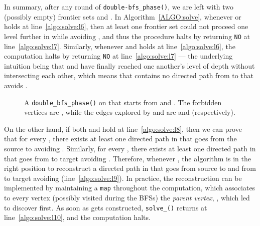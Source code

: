 In summary, after any round of \texttt{double-bfs\_phase()}, we are left with two (possibly empty) frontier sets  and .
In Algorithm~\ref{ALGO:solve}, whenever  or  holds at line~\ref{algo:solve:l6},
then at least one frontier set could not proceed one level further in  while avoiding ,
and thus the procedure halts by returning \texttt{NO} at line~\ref{algo:solve:l7}.
Similarly, whenever  and  holds at line~\ref{algo:solve:l6},
the computation halts by returning \texttt{NO} at line~\ref{algo:solve:l7} --- the underlying intuition being that
 and  have finally reached one another's level of depth without intersecting each other,
which means that  contains no directed path from  to  that avoids .

\begin{figure}[htbp]
\centering
{}
\caption{A \texttt{double\_bfs\_phase()} on  that starts from  and .
The forbidden vertices are ,
 while the edges explored by  and
 are  and  (respectively).}\label{fig:double_bfs_phase}
\end{figure}

On the other
hand,
if both  and
 hold at line~\ref{algo:solve:l8},
then we can prove that for
every , there exists at least one directed path in 
that goes from the source  to  avoiding .
Similarly, for every , there exists at least one directed
path in  that goes from  to target  avoiding .
Therefore, whenever , the algorithm is in the right position to reconstruct
a directed path  in  that goes
from source  to  and from  to target  avoiding  (line~\ref{algo:solve:l9}).
In practice, the reconstruction can be implemented by maintaining a \texttt{map}
throughout the computation, which associates to every vertex  (possibly visited during the BFSs)
the \emph{parent vertex}, , which
led to discover  first.
As soon as  gets constructed,
\texttt{solve\_\mainproblem()} returns 
at line~\ref{algo:solve:l10},
and the computation halts.

